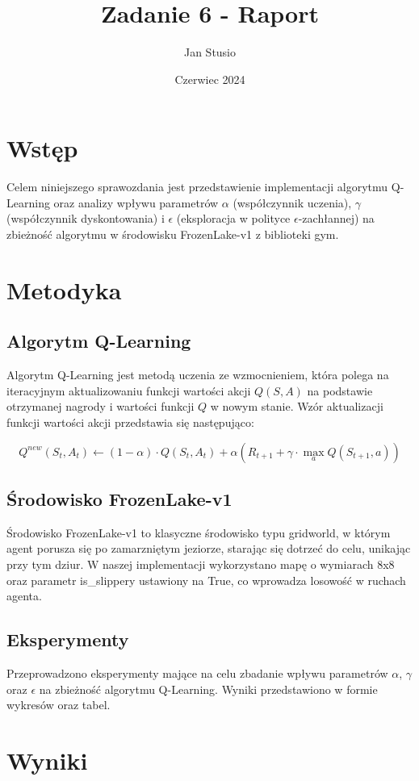\documentclass{article}
\title{Zadanie 6 - Raport}
\author{Jan Stusio}
\date{Czerwiec 2024}
\begin{document}
\maketitle

\section{Wstęp}
Celem niniejszego sprawozdania jest przedstawienie implementacji algorytmu Q-Learning oraz analizy wpływu parametrów $\alpha$ (współczynnik uczenia), $\gamma$ (współczynnik dyskontowania) i $\epsilon$ (eksploracja w polityce $\epsilon$-zachłannej) na zbieżność algorytmu w środowisku FrozenLake-v1 z biblioteki gym. 

\section{Metodyka}
\subsection{Algorytm Q-Learning}
Algorytm Q-Learning jest metodą uczenia ze wzmocnieniem, która polega na iteracyjnym aktualizowaniu funkcji wartości akcji $Q(S, A)$ na podstawie otrzymanej nagrody i wartości funkcji $Q$ w nowym stanie. Wzór aktualizacji funkcji wartości akcji przedstawia się następująco:

\[
Q^{new}(S_t, A_t) \leftarrow (1 - \alpha) \cdot Q(S_t, A_t) + \alpha (R_{t+1} + \gamma \cdot \max_{a} Q(S_{t+1}, a))
\]

\subsection{Środowisko FrozenLake-v1}
Środowisko FrozenLake-v1 to klasyczne środowisko typu gridworld, w którym agent porusza się po zamarzniętym jeziorze, starając się dotrzeć do celu, unikając przy tym dziur. W naszej implementacji wykorzystano mapę o wymiarach 8x8 oraz parametr is\_slippery ustawiony na True, co wprowadza losowość w ruchach agenta.

\subsection{Eksperymenty}
Przeprowadzono eksperymenty mające na celu zbadanie wpływu parametrów $\alpha$, $\gamma$ oraz $\epsilon$ na zbieżność algorytmu Q-Learning. Wyniki przedstawiono w formie wykresów oraz tabel.

\section{Wyniki}
\end{document}
